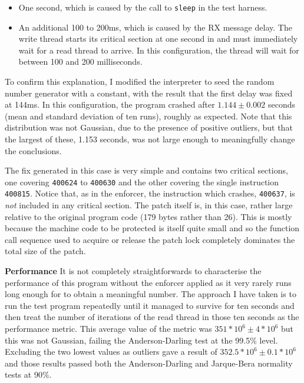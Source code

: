 \begin{itemize}
\item One second, which is caused by the call to \verb|sleep| in the
  test harness.
\item An additional 100 to 200ms, which is caused by the RX message
  delay.  The write thread starts its critical section at one second
  in and must immediately wait for a read thread to arrive.  In this
  configuration, the thread will wait for between 100 and 200
  milliseconds.
\end{itemize}

To confirm this explanation, I modified the interpreter to seed the
random number generator with a constant, with the result that the
first delay was fixed at 144ms.  In this configuration, the program
crashed after $1.144 \pm 0.002$ seconds (mean and standard deviation
of ten runs), roughly as expected.  Note that this distribution was
not Gaussian, due to the presence of positive outliers, but that the
largest of these, 1.153 seconds, was not large enough to meaningfully
change the conclusions.  

The fix generated in this case is very simple and contains two
critical sections, one covering \verb|400624| to \verb|400630| and the
other covering the single instruction \verb|400815|.  Notice that, as
in the enforcer, the instruction which crashes, \verb|400637|, is
\emph{not} included in any critical section.  The patch itself is, in
this case, rather large relative to the original program code (179
bytes rather than 26).  This is mostly because the machine code to be
protected is itself quite small and so the function call sequence used
to acquire or release the patch lock completely dominates the total
size of the patch.

\textbf{Performance}  It is not completely straightforwards to
characterise the performance of this program without the enforcer
applied as it very rarely runs long enough for to obtain a meaningful
number.  The approach I have taken is to run the test program
repeatedly until it managed to survive for ten seconds and then treat
the number of iterations of the read thread in those ten seconds as
the performance metric.  This average value of the metric was
$351*10^6 \pm 4*10^6$ but this was not Gaussian, failing the
Anderson-Darling test at the 99.5\% level.  Excluding the two lowest
values as outliers gave a result of $352.5 * 10^6 \pm 0.1 * 10^6$ and
those results passed both the Anderson-Darling and Jarque-Bera
normality tests at 90\%.

